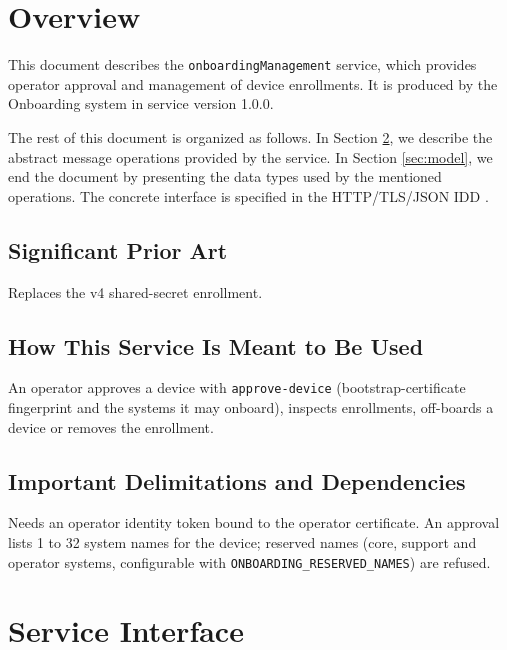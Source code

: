 \documentclass[a4paper]{arrowhead}
\begin{document}
\section{Overview}
\label{sec:overview}

This document describes the \texttt{onboarding\allowbreak{}Management} service, which provides operator approval and management of device enrollments.
It is produced by the Onboarding system \cite{onb-sysd} in service version 1.0.0.

The rest of this document is organized as follows.
In Section \ref{sec:operations}, we describe the abstract message operations provided by the service.
In Section \ref{sec:model}, we end the document by presenting the data types used by the mentioned operations.
The concrete interface is specified in the HTTP/TLS/JSON IDD \cite{onb-onboardingManagement-http-idd}.

\subsection{Significant Prior Art}

Replaces the v4 shared-secret enrollment.

\subsection{How This Service Is Meant to Be Used}

An operator approves a device with \texttt{approve-\allowbreak{}device} (bootstrap-certificate fingerprint and the systems it may onboard), inspects enrollments, off-boards a device or removes the enrollment.

\subsection{Important Delimitations and Dependencies}
\label{sec:delimitations}

Needs an operator identity token bound to the operator certificate. An approval lists 1 to 32 system names for the device; reserved names (core, support and operator systems, configurable with \texttt{ONBOARDING\_\allowbreak{}RESERVED\_\allowbreak{}NAMES}) are refused.

\newpage

\section{Service Interface}
\label{sec:operations}
\end{document}
